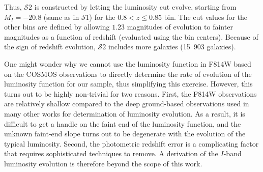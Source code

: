 \documentclass[twocolumn,useAMS,usenatbib]{mn2e}
\newcommand{\s}{\ensuremath{\mathcal{S}}}
\begin{document}
Thus, \s$2$ is constructed by letting the luminosity cut evolve,
starting from $M_I = -20.8$ (same as in \s$1$) for the $0.8<z\le0.85$
bin.  The cut values for the other bins are defined by allowing $1.23$
magnitudes of evolution to fainter magnitudes as a function of
redshift (evaluated using the bin centers).  Because of the sign of
redshift evolution, \s$2$ includes  more galaxies (15~903 galaxies). 

One might wonder why we cannot use the luminosity function in F814W
based on the COSMOS observations to directly determine the rate of evolution of the luminosity
function for our sample, thus simplifying this exercise.  However,
this turns out to be highly non-trivial for two reasons.  First, the
F814W observations are relatively shallow compared to the deep
ground-based observations used in many other works for determination
of luminosity evolution.  As a result, it is difficult to get a handle
on the faint end of the luminosity function, and the unknown faint-end
slope turns out to be degenerate with the evolution of the typical
luminosity.  Second, the photometric redshift error is a complicating
factor that requires sophisticated techniques to remove.  A derivation
of the $I$-band luminosity evolution is therefore beyond the scope of
this work.

\end{document}
